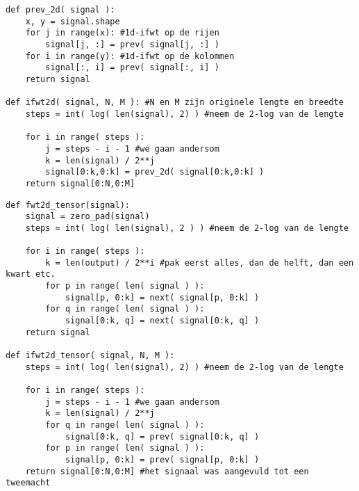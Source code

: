 \begin{lstlisting}[label=ifwt2d,float=h!,caption=De inverse Mallatdecompositie in 2 dimensies]	
def prev_2d( signal ):
	x, y = signal.shape
	for j in range(x): #1d-ifwt op de rijen
		signal[j, :] = prev( signal[j, :] )
	for i in range(y): #1d-ifwt op de kolommen
		signal[:, i] = prev( signal[:, i] )
	return signal

def ifwt2d( signal, N, M ): #N en M zijn originele lengte en breedte
	steps = int( log( len(signal), 2) ) #neem de 2-log van de lengte
	
	for i in range( steps ):
		j = steps - i - 1 #we gaan andersom
		k = len(signal) / 2**j
		signal[0:k,0:k] = prev_2d( signal[0:k,0:k] )
	return signal[0:N,0:M]
\end{lstlisting}

\begin{lstlisting}[label=tensorimpl,float=h!,caption=De 2D FWT in het Tensorgeval]
def fwt2d_tensor(signal):
	signal = zero_pad(signal)
	steps = int( log( len(signal), 2 ) ) #neem de 2-log van de lengte
	
	for i in range( steps ):
		k = len(output) / 2**i #pak eerst alles, dan de helft, dan een kwart etc.
		for p in range( len( signal ) ):
			signal[p, 0:k] = next( signal[p, 0:k] )
		for q in range( len( signal ) ):
			signal[0:k, q] = next( signal[0:k, q] )
	return signal

def ifwt2d_tensor( signal, N, M ):
	steps = int( log( len(signal), 2) ) #neem de 2-log van de lengte
	
	for i in range( steps ):
		j = steps - i - 1 #we gaan andersom
		k = len(signal) / 2**j
		for q in range( len( signal ) ):
			signal[0:k, q] = prev( signal[0:k, q] )
		for p in range( len( signal ) ):
			signal[p, 0:k] = prev( signal[p, 0:k] )
	return signal[0:N,0:M] #het signaal was aangevuld tot een tweemacht
\end{lstlisting}

